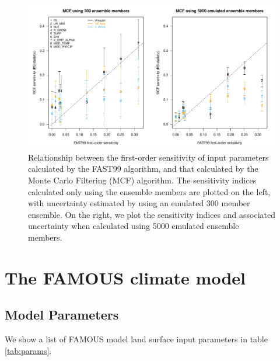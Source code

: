 \documentclass[gmd, manuscript]{copernicus} %
\begin{document}
\begin{figure}[t]
\includegraphics[width=12cm]{../graphics/fast99_vs_mcf2.pdf}
\caption{Relationship between the first-order sensitivity of input parameters calculated by the FAST99 algorithm, and that calculated by the Monte Carlo Filtering (MCF) algorithm. The sensitivity indices calculated only using the ensemble members are plotted on the left, with uncertainty estimated by using an emulated 300 member ensemble. On the right, we plot the sensitivity indices and associated uncertainty when calculated using 5000 emulated ensemble members.}
\label{fig:fast99_vs_mcf2}
\end{figure}

\section{The FAMOUS climate model}\label{ssec:famous_model}

\subsection{Model Parameters}\label{ssec:model_params}

We show a list of FAMOUS model land surface input parameters in table \ref{tab:params}.
\end{document}
